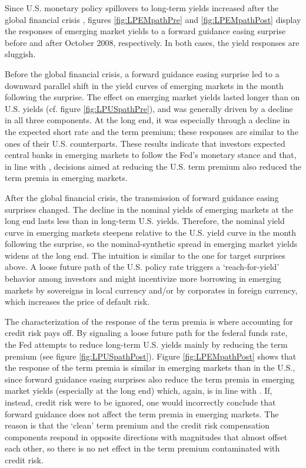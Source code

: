 {Since U.S. monetary policy spillovers to long-term yields increased after the global financial crisis \citep{Albaglietal:2019}, figures \ref{fig:LPEMpathPre} and \ref{fig:LPEMpathPost} display the responses of emerging market yields to a forward guidance easing surprise before and after October 2008, respectively. 
In both cases, the yield responses are sluggish.

Before the global financial crisis, a forward guidance easing surprise led to a downward parallel shift in the yield curves of emerging markets in the month following the surprise. 
The effect on emerging market yields lasted longer than on U.S. yields (cf. figure \ref{fig:LPUSpathPre}), and was generally driven by a decline in all three components. At the long end, it was especially through a decline in the expected short rate and the term premium; these responses are similar to the ones of their U.S. counterparts. These results indicate that investors expected central banks in emerging markets to follow the Fed's monetary stance and that, in line with \cite{Turner:2014}, decisions aimed at reducing the U.S. term premium also reduced the term premia in emerging markets. 

After the global financial crisis, the transmission of forward guidance easing surprises changed. 
The decline in the nominal yields of emerging markets at the long end lasts less than in long-term U.S. yields. 
Therefore, the nominal yield curve in emerging markets steepens relative to the U.S. yield curve in the month following the surprise, so the nominal-synthetic spread in emerging market yields widens at the long end.
The intuition is similar to the one for target surprises above. A loose future path of the U.S. policy rate triggers a `reach-for-yield' behavior among investors and might incentivize more borrowing in emerging markets by sovereigns in local currency and/or by corporates in foreign currency, which increases the price of default risk.

The characterization of the response of the term premia is where accounting for credit risk pays off. 
By signaling a loose future path for the federal funds rate, the Fed attempts to reduce long-term U.S. yields mainly by reducing the term premium (see figure \ref{fig:LPUSpathPost}). 
Figure \ref{fig:LPEMpathPost} shows that the response of the term premia is similar in emerging markets than in the U.S., since forward guidance easing surprises also reduce the term premia in emerging market yields (especially at the long end) which, again, is in line with \cite{Turner:2014}. 
If, instead, credit risk were to be ignored, one would incorrectly conclude that forward guidance does not affect the term premia in emerging markets. The reason is that the `clean' term premium and the credit risk compensation components respond in opposite directions with magnitudes that almost offset each other, so there is no net effect in the term premium contaminated with credit risk.

}
